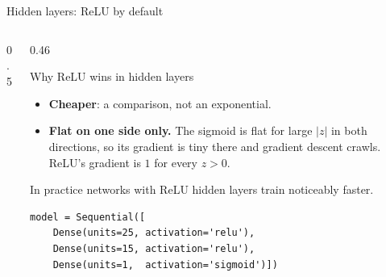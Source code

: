 \documentclass[aspectratio=169,10pt]{beamer}
\begin{document}
\begin{frame}[fragile]{Hidden layers: ReLU by default}
  \begin{columns}[T,onlytextwidth]
    \begin{column}{0.5\textwidth}
      \par
    \end{column}
    \begin{column}{0.46\textwidth}
      \footnotesize
      \begin{block}{Why ReLU wins in hidden layers}
        \begin{itemize}
          \item \textbf{Cheaper}: a comparison, not an exponential.
          \item \textbf{Flat on one side only.} The sigmoid is flat for large $|z|$ in both
                directions, so its gradient is tiny there and gradient descent crawls.
                ReLU's gradient is $1$ for every $z>0$.
        \end{itemize}
        In practice networks with ReLU hidden layers train noticeably faster.
      \end{block}
\begin{lstlisting}
model = Sequential([
    Dense(units=25, activation='relu'),
    Dense(units=15, activation='relu'),
    Dense(units=1,  activation='sigmoid')])
\end{lstlisting}
    \end{column}
  \end{columns}
\end{frame}

\end{document}
